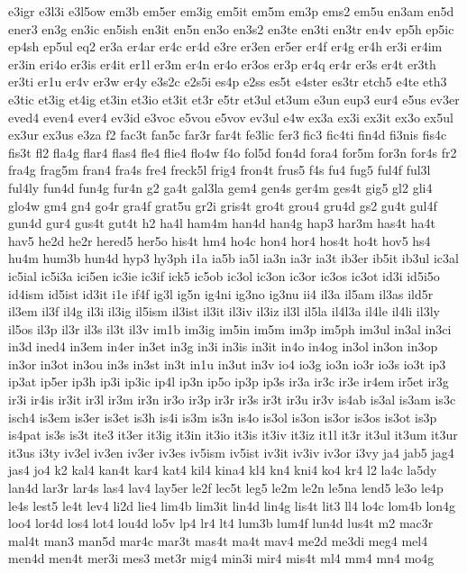 e3igr
e3l3i
e3l5ow
em3b
em5er
em3ig
em5it
em5m
em3p
ems2
em5u
en3am
en5d
ener3
en3g
en3ic
en5ish
en3it
en5n
en3o
en3s2
en3te
en3ti
en3tr
en4v
ep5h
ep5ic
ep4sh
ep5ul
eq2
er3a
er4ar
er4c
er4d
e3re
er3en
er5er
er4f
er4g
er4h
er3i
er4im
er3in
eri4o
er3is
er4it
er1l
er3m
er4n
er4o
er3os
er3p
er4q
er4r
er3s
er4t
er3th
er3ti
er1u
er4v
er3w
er4y
e3s2c
e2s5i
es4p
e2ss
es5t
e4ster
es3tr
etch5
e4te
eth3
e3tic
et3ig
et4ig
et3in
et3io
et3it
et3r
e5tr
et3ul
et3um
e3un
eup3
eur4
e5us
ev3er
eved4
even4
ever4
ev3id
e3voc
e5vou
e5vov
ev3ul
e4w
ex3a
ex3i
ex3it
ex3o
ex5ul
ex3ur
ex3us
e3za
f2
fac3t
fan5c
far3r
far4t
fe3lic
fer3
fic3
fic4ti
fin4d
fi3nis
fis4c
fis3t
fl2
fla4g
flar4
flas4
fle4
flie4
flo4w
f4o
fol5d
fon4d
fora4
for5m
for3n
for4s
fr2
fra4g
frag5m
fran4
fra4s
fre4
freck5l
frig4
fron4t
frus5
f4s
fu4
fug5
ful4f
ful3l
ful4ly
fun4d
fun4g
fur4n
g2
ga4t
gal3la
gem4
gen4s
ger4m
ges4t
gig5
gl2
gli4
glo4w
gm4
gn4
go4r
gra4f
grat5u
gr2i
gris4t
gro4t
grou4
gru4d
gs2
gu4t
gul4f
gun4d
gur4
gus4t
gut4t
h2
ha4l
ham4m
han4d
han4g
hap3
har3m
has4t
ha4t
hav5
he2d
he2r
hered5
her5o
his4t
hm4
ho4c
hon4
hor4
hos4t
ho4t
hov5
hs4
hu4m
hum3b
hun4d
hyp3
hy3ph
i1a
ia5b
ia5l
ia3n
ia3r
ia3t
ib3er
ib5it
ib3ul
ic3al
ic5ial
ic5i3a
ici5en
ic3ie
ic3if
ick5
ic5ob
ic3ol
ic3on
ic3or
ic3os
ic3ot
id3i
id5i5o
id4ism
id5ist
id3it
i1e
if4f
ig3l
ig5n
ig4ni
ig3no
ig3nu
ii4
il3a
il5am
il3as
ild5r
il3em
il3f
il4g
il3i
il3ig
il5ism
il3ist
il3it
il3iv
il3iz
il3l
il5la
il4l3a
il4le
il4li
il3ly
il5os
il3p
il3r
il3s
il3t
il3v
im1b
im3ig
im5in
im5m
im3p
im5ph
im3ul
in3al
in3ci
in3d
ined4
in3em
in4er
in3et
in3g
in3i
in3is
in3it
in4o
in4og
in3ol
in3on
in3op
in3or
in3ot
in3ou
in3s
in3st
in3t
in1u
in3ut
in3v
io4
io3g
io3n
io3r
io3s
io3t
ip3
ip3at
ip5er
ip3h
ip3i
ip3ic
ip4l
ip3n
ip5o
ip3p
ip3s
ir3a
ir3c
ir3e
ir4em
ir5et
ir3g
ir3i
ir4is
ir3it
ir3l
ir3m
ir3n
ir3o
ir3p
ir3r
ir3s
ir3t
ir3u
ir3v
is4ab
is3al
is3am
is3c
isch4
is3em
is3er
is3et
is3h
is4i
is3m
is3n
is4o
is3ol
is3on
is3or
is3os
is3ot
is3p
is4pat
is3s
is3t
ite3
it3er
it3ig
it3in
it3io
it3is
it3iv
it3iz
it1l
it3r
it3ul
it3um
it3ur
it3us
i3ty
iv3el
iv3en
iv3er
iv3es
iv5ism
iv5ist
iv3it
iv3iv
iv3or
i3vy
ja4
jab5
jag4
jas4
jo4
k2
kal4
kan4t
kar4
kat4
kil4
kina4
kl4
kn4
kni4
ko4
kr4
l2
la4c
la5dy
lan4d
lar3r
lar4s
las4
lav4
lay5er
le2f
lec5t
leg5
le2m
le2n
le5na
lend5
le3o
le4p
le4s
lest5
le4t
lev4
li2d
lie4
lim4b
lim3it
lin4d
lin4g
lis4t
lit3
ll4
lo4c
lom4b
lon4g
loo4
lor4d
los4
lot4
lou4d
lo5v
lp4
lr4
lt4
lum3b
lum4f
lun4d
lus4t
m2
mac3r
mal4t
man3
man5d
mar4c
mar3t
mas4t
ma4t
mav4
me2d
me3di
meg4
mel4
men4d
men4t
mer3i
mes3
met3r
mig4
min3i
mir4
mis4t
ml4
mm4
mn4
mo4g
